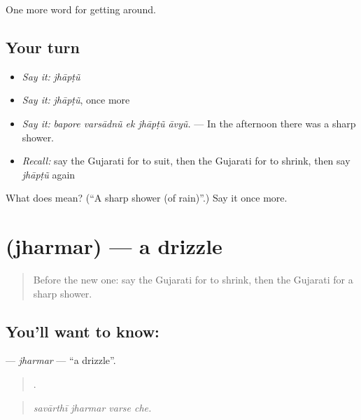 \begin{grammarlens}[title={What you've built}]
One more word for getting around.
\end{grammarlens}

\subsection*{Your turn}
\begin{itemize}
\raggedright
  \item \emph{Say it:} \emph{jhāpṭũ}
  \item \emph{Say it:} \emph{jhāpṭũ}, once more
  \item \emph{Say it:} \emph{bapore varsādnũ ek jhāpṭũ āvyũ.} — In the afternoon there was a sharp shower.
  \item \emph{Recall:} say the Gujarati for to suit, then the Gujarati for to shrink, then say \emph{jhāpṭũ} again
\end{itemize}

\begin{tcolorbox}[breakable,colback=teal!4,colframe=teal!35!black,title={Before you move on}]
What does  mean? (\textquotedblleft{}A sharp shower (of rain)\textquotedblright{}.) Say it once more.
\end{tcolorbox}
\section[\texorpdfstring{\gu{ઝરમર} (jharmar)}{ઝરમર (jharmar)}]{ (jharmar) — a drizzle}

\label{lesson:GU-C434-jharmar}



\begin{quote}
Before the new one: say the Gujarati for to shrink, then the Gujarati for a sharp shower.
\end{quote}

\subsection*{You'll want to know: }
\textbf{} — \emph{jharmar} — \textquotedblleft{}a drizzle\textquotedblright{}.

\begin{quote}
   .
\end{quote}

\begin{quote}
\emph{savārthī jharmar varse che.}
\end{quote}

